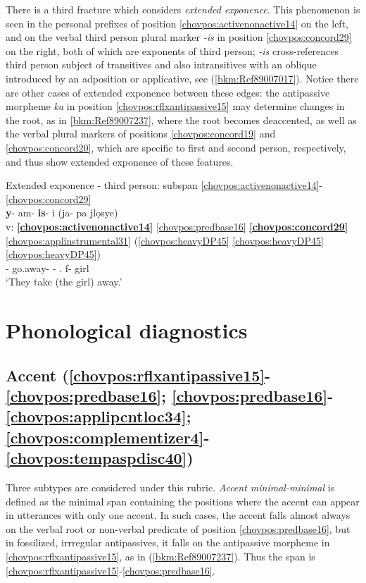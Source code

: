 \documentclass[output=paper]{langscibook}
\begin{document}
\largerpage
\hspace*{-2.1pt}There is a third fracture which considers \textit{extended exponence}. This phenomenon is seen in the personal prefixes of position \ref{chovpos:activenonactive14} on the left, and on the verbal third person plural marker \textit{-is} in position \ref{chovpos:concord29} on the right, both of which are exponents of third person; \textit{-is} cross{}-references third person subject of transitives and also intransitives with an oblique introduced by an adposition or applicative, see (\ref{bkm:Ref89007017}). Notice there are other cases of extended exponence between these edges: the antipassive morpheme \textit{ka} in position \ref{chovpos:rflxantipassive15} may determine changes in the root, as in \ref{bkm:Ref89007237}, where the root becomes deaccented, as well as the verbal plural markers of positions \ref{chovpos:concord19} and \ref{chovpos:concord20}, which are specific to first and second person, respectively, and thus show extended exponence of these features.

\ea\label{bkm:Ref89007017}Extended exponence - third person: subspan \ref{chovpos:activenonactive14}{}-\ref{chovpos:concord29}\\
\glll {} \textbf{y}{}- am- \textbf{is}{}- i (ja- pa jlọsye)\\ 
v: \textbf{\ref{chovpos:activenonactive14}} \ref{chovpos:predbase16} \textbf{\ref{chovpos:concord29}} \ref{chovpos:applinstrumental31} (\ref{chovpos:heavyDP45} \ref{chovpos:heavyDP45} \ref{chovpos:heavyDP45})\\ 
{} \textbf{\Third{}}- go.away- \textbf{\Third\Pl{}}- \Ap.\Ins{} f- \Dem{} girl  \\
\glt `They take (the girl) away.' 
\z 

\largerpage[2]
\section{Phonological diagnostics}
\label{bkm:Ref82962099}
\subsection{Accent (\ref{chovpos:rflxantipassive15}{}-\ref{chovpos:predbase16}; \ref{chovpos:predbase16}{}-\ref{chovpos:applipcntloc34}; \ref{chovpos:complementizer4}{}-\ref{chovpos:tempaspdisc40})}

Three subtypes are considered under this rubric. \textit{Accent minimal-minimal} is defined as the minimal span containing the positions where the accent can appear in utterances with only one accent. In such cases, the accent falls almost always on the verbal root or non-verbal predicate of position \ref{chovpos:predbase16}, but in fossilized, irrregular antipassives, it falls on the antipassive morpheme in \ref{chovpos:rflxantipassive15}, as in (\ref{bkm:Ref89007237}). Thus the span is \ref{chovpos:rflxantipassive15}{}-\ref{chovpos:predbase16}. 
\end{document}
